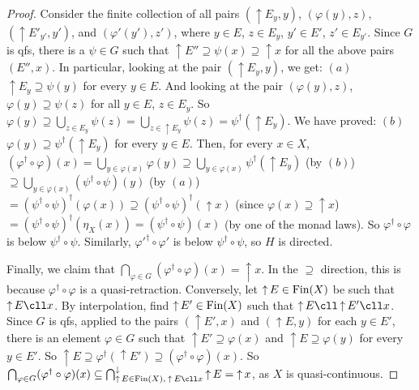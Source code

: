 \documentclass{LMCS}
\newcommand\upc{\mathop{\uparrow}\nolimits}
\begin{document}
\begin{proof}
  Consider the finite collection of all pairs $(\upc E_y, y)$,
  $(\varphi (y), z)$, $(\upc E'_{y'}, y')$, and $(\varphi' (y'), z')$,
  where $y \in E$, $z \in E_y$, $y' \in E'$, $z' \in E_{y'}$.  Since
  $G$ is qfs, there is a $\psi \in G$ such that $\upc E'' \supseteq
  \psi (x) \supseteq \upc x$ for all the above pairs $(E'', x)$.  In
  particular, looking at the pair $(\upc E_y, y)$, we get: $(a)$ $\upc
  E_y \supseteq \psi (y)$ for every $y \in E$.  And looking at the
  pair $(\varphi (y), z)$, $\varphi (y) \supseteq \psi (z)$ for all $y
  \in E$, $z \in E_y$.  So $\varphi (y) \supseteq \bigcup_{z \in E_y}
  \psi (z) = \bigcup_{z \in \upc E_y} \psi (z) = \psi^\dagger (\upc
  E_y)$.  We have proved: $(b)$ $\varphi (y) \supseteq \psi^\dagger
  (\upc E_y)$ for every $y \in E$.  Then, for every $x \in X$,
  $(\varphi^\dagger \circ \varphi) (x) = \bigcup_{y \in \varphi (x)}
  \varphi (y) \supseteq \bigcup_{y \in \varphi (x)} \psi^\dagger (\upc E_y)$ (by $(b)$)
  $\supseteq \bigcup_{y \in \varphi (x)} (\psi^\dagger \circ \psi) (y)$ (by
  $(a)$) $= (\psi^\dagger \circ \psi)^\dagger (\varphi (x)) \supseteq
  (\psi^\dagger \circ \psi)^\dagger (\upc x)$ (since $\varphi (x)
  \supseteq \upc x$) $= (\psi^\dagger \circ \psi)^\dagger (\eta_X (x))
  = (\psi^\dagger \circ \psi) (x)$ (by one of the monad laws).  So
  $\varphi^\dagger \circ \varphi$ is below $\psi^\dagger \circ \psi$.
  Similarly, ${\varphi'}^\dagger \circ {\varphi'}$ is below
  $\psi^\dagger \circ \psi$, so $H$ is directed.

  Finally, we claim that $\bigcap_{\varphi \in G} (\varphi^\dagger
  \circ \varphi) (x) = \upc x$.  In the $\supseteq$ direction, this is
  because $\varphi^\dagger \circ \varphi$ is a quasi-retraction.
  Conversely, let $\upc E \in \Fin (X)$ be such that $\upc E \cll x$.
  By interpolation, find $\upc E' \in \Fin (X)$ such that $\upc E \cll
  \upc E' \cll x$.  Since $G$ is qfs, applied to the pairs $(\upc E',
  x)$ and $(\upc E, y)$ for each $y \in E'$, there is an element
  $\varphi \in G$ such that $\upc E' \supseteq \varphi (x)$ and $\upc
  E \supseteq \varphi (y)$ for every $y \in E'$.  So $\upc E \supseteq
  \varphi^\dagger (\upc E') \supseteq (\varphi^\dagger \circ \varphi)
  (x)$.  So $\bigcap_{\varphi \in G} (\varphi^\dagger \circ \varphi)
  (x) \subseteq \bigcap_{\upc E \in \Fin (X),\: \upc E \cll
    x}^\downarrow \upc E = \upc x$, as $X$ is quasi-continuous.
\end{proof}
\end{document}
